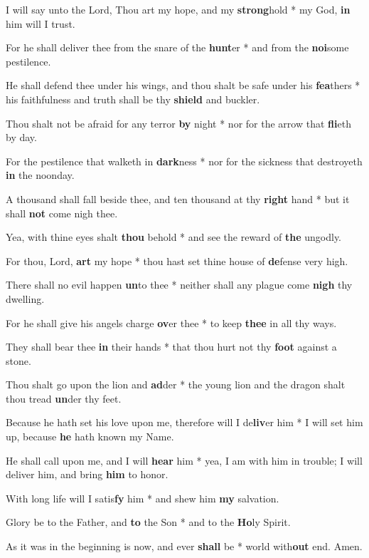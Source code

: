 \begin{multicols}{2}
	I will say unto the Lord, Thou art my hope, and my \textbf{strong}hold * my God, \textbf{in} him will I trust.
	
	For he shall deliver thee from the snare of the \textbf{hunt}er * and from the \textbf{noi}some pestilence.
	
	He shall defend thee under his wings, and thou shalt be safe under his \textbf{fea}thers * his faithfulness and truth shall be thy \textbf{shield} and buckler.
	
	Thou shalt not be afraid for any terror \textbf{by} night * nor for the arrow that \textbf{fli}eth by day.
	
	For the pestilence that walketh in \textbf{dark}ness * nor for the sickness that destroyeth \textbf{in} the noonday.
	
	A thousand shall fall beside thee, and ten thousand at thy \textbf{right} hand * but it shall \textbf{not} come nigh thee.
	
	Yea, with thine eyes shalt \textbf{thou} behold * and see the reward of \textbf{the} ungodly.
	
	For thou, Lord, \textbf{art} my hope * thou hast set thine house of \textbf{de}fense very high.
	
	There shall no evil happen \textbf{un}to thee * neither shall any plague come \textbf{nigh} thy dwelling.
	
	For he shall give his angels charge \textbf{ov}er thee * to keep \textbf{thee} in all thy ways.
	
	They shall bear thee \textbf{in} their hands * that thou hurt not thy \textbf{foot} against a stone.
	
	Thou shalt go upon the lion and \textbf{ad}der * the young lion and the dragon shalt thou tread \textbf{un}der thy feet.
	
	Because he hath set his love upon me, therefore will I de\textbf{liv}er him * I will set him up, because \textbf{he} hath known my Name.
	
	He shall call upon me, and I will \textbf{hear} him * yea, I am with him in trouble; I will deliver him, and bring \textbf{him} to honor.
	
	With long life will I satis\textbf{fy} him * and shew him \textbf{my} salvation.
	
	Glory be to the Father, and \textbf{to} the Son * and to the \textbf{Ho}ly Spirit.
	
	As it was in the beginning is now, and ever \textbf{shall} be * world with\textbf{out} end. Amen.
\end{multicols}